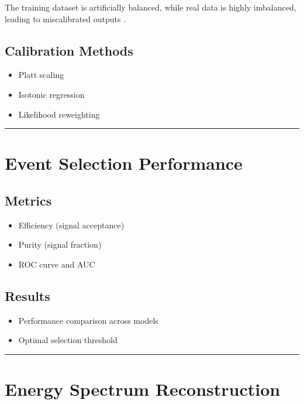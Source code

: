 \documentclass[
  authoryear,
  preprint]{elsarticle}
\providecommand{\tightlist}{%
  \setlength{\itemsep}{0pt}\setlength{\parskip}{0pt}}
\begin{document}
The training dataset is artificially balanced, while real data is highly
imbalanced, leading to miscalibrated outputs .

\subsection{Calibration Methods}\label{calibration-methods}

\begin{itemize}
\tightlist
\item
  Platt scaling
\item
  Isotonic regression
\item
  Likelihood reweighting
\end{itemize}

\begin{center}\rule{0.5\linewidth}{0.5pt}\end{center}

\section{Event Selection Performance}\label{event-selection-performance}

\subsection{Metrics}\label{metrics}

\begin{itemize}
\tightlist
\item
  Efficiency (signal acceptance)
\item
  Purity (signal fraction)
\item
  ROC curve and AUC
\end{itemize}

\subsection{Results}\label{results}

\begin{itemize}
\tightlist
\item
  Performance comparison across models
\item
  Optimal selection threshold
\end{itemize}

\begin{center}\rule{0.5\linewidth}{0.5pt}\end{center}

\section{Energy Spectrum
Reconstruction}\label{energy-spectrum-reconstruction}
\end{document}
